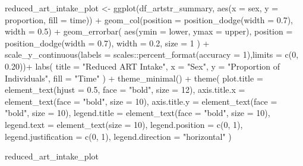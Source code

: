 \documentclass[
  letterpaper,
  DIV=11,
  numbers=noendperiod]{scrartcl}
\newenvironment{Shaded}{\begin{snugshade}}{\end{snugshade}}
\newcommand{\AttributeTok}[1]{\textcolor[rgb]{0.40,0.45,0.13}{#1}}
\newcommand{\DecValTok}[1]{\textcolor[rgb]{0.68,0.00,0.00}{#1}}
\newcommand{\FloatTok}[1]{\textcolor[rgb]{0.68,0.00,0.00}{#1}}
\newcommand{\FunctionTok}[1]{\textcolor[rgb]{0.28,0.35,0.67}{#1}}
\newcommand{\NormalTok}[1]{\textcolor[rgb]{0.00,0.23,0.31}{#1}}
\newcommand{\OtherTok}[1]{\textcolor[rgb]{0.00,0.23,0.31}{#1}}
\newcommand{\SpecialCharTok}[1]{\textcolor[rgb]{0.37,0.37,0.37}{#1}}
\newcommand{\StringTok}[1]{\textcolor[rgb]{0.13,0.47,0.30}{#1}}
\begin{document}
\begin{Shaded}
\begin{Highlighting}[]
\NormalTok{reduced\_art\_intake\_plot }\OtherTok{\textless{}{-}} \FunctionTok{ggplot}\NormalTok{(df\_artstr\_summary, }\FunctionTok{aes}\NormalTok{(}\AttributeTok{x =}\NormalTok{ sex, }\AttributeTok{y =}\NormalTok{ proportion, }\AttributeTok{fill =}\NormalTok{ time)) }\SpecialCharTok{+}
  \FunctionTok{geom\_col}\NormalTok{(}\AttributeTok{position =} \FunctionTok{position\_dodge}\NormalTok{(}\AttributeTok{width =} \FloatTok{0.7}\NormalTok{), }\AttributeTok{width =} \FloatTok{0.5}\NormalTok{) }\SpecialCharTok{+}
  \FunctionTok{geom\_errorbar}\NormalTok{(}
    \FunctionTok{aes}\NormalTok{(}\AttributeTok{ymin =}\NormalTok{ lower, }\AttributeTok{ymax =}\NormalTok{ upper),}
    \AttributeTok{position =} \FunctionTok{position\_dodge}\NormalTok{(}\AttributeTok{width =} \FloatTok{0.7}\NormalTok{),}
    \AttributeTok{width =} \FloatTok{0.2}\NormalTok{,}
    \AttributeTok{size =} \DecValTok{1}
\NormalTok{  ) }\SpecialCharTok{+}
  \FunctionTok{scale\_y\_continuous}\NormalTok{(}\AttributeTok{labels =}\NormalTok{ scales}\SpecialCharTok{::}\FunctionTok{percent\_format}\NormalTok{(}\AttributeTok{accuracy =} \DecValTok{1}\NormalTok{),}\AttributeTok{limits =} \FunctionTok{c}\NormalTok{(}\DecValTok{0}\NormalTok{, }\FloatTok{0.20}\NormalTok{))}\SpecialCharTok{+}
  \FunctionTok{labs}\NormalTok{(}
    \AttributeTok{title =} \StringTok{"Reduced ART Intake"}\NormalTok{,}
    \AttributeTok{x =} \StringTok{"Sex"}\NormalTok{,}
    \AttributeTok{y =} \StringTok{"Proportion of Individuals"}\NormalTok{,}
    \AttributeTok{fill =} \StringTok{"Time"}
\NormalTok{  ) }\SpecialCharTok{+}
  \FunctionTok{theme\_minimal}\NormalTok{() }\SpecialCharTok{+}
  \FunctionTok{theme}\NormalTok{(}
    \AttributeTok{plot.title =} \FunctionTok{element\_text}\NormalTok{(}\AttributeTok{hjust =} \FloatTok{0.5}\NormalTok{, }\AttributeTok{face =} \StringTok{"bold"}\NormalTok{, }\AttributeTok{size =} \DecValTok{12}\NormalTok{),}
    \AttributeTok{axis.title.x =} \FunctionTok{element\_text}\NormalTok{(}\AttributeTok{face =} \StringTok{"bold"}\NormalTok{, }\AttributeTok{size =} \DecValTok{10}\NormalTok{),}
    \AttributeTok{axis.title.y =} \FunctionTok{element\_text}\NormalTok{(}\AttributeTok{face =} \StringTok{"bold"}\NormalTok{, }\AttributeTok{size =} \DecValTok{10}\NormalTok{),}
    \AttributeTok{legend.title =} \FunctionTok{element\_text}\NormalTok{(}\AttributeTok{face =} \StringTok{"bold"}\NormalTok{, }\AttributeTok{size =} \DecValTok{10}\NormalTok{),}
    \AttributeTok{legend.text =} \FunctionTok{element\_text}\NormalTok{(}\AttributeTok{size =} \DecValTok{10}\NormalTok{),}
    \AttributeTok{legend.position =} \FunctionTok{c}\NormalTok{(}\DecValTok{0}\NormalTok{, }\DecValTok{1}\NormalTok{),}
    \AttributeTok{legend.justification =} \FunctionTok{c}\NormalTok{(}\DecValTok{0}\NormalTok{, }\DecValTok{1}\NormalTok{),}
    \AttributeTok{legend.direction =} \StringTok{"horizontal"}
\NormalTok{  )}

\NormalTok{reduced\_art\_intake\_plot}
\end{Highlighting}
\end{Shaded}
\end{document}
